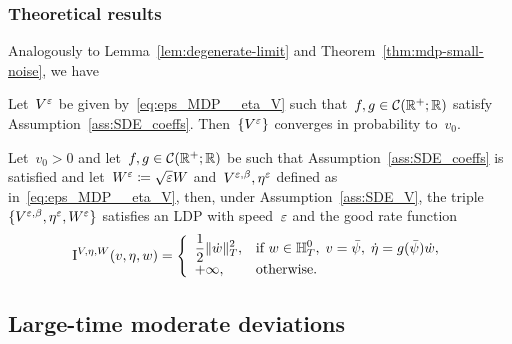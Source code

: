 \subsubsection{Theoretical results}

Analogously to Lemma~\ref{lem:degenerate-limit} and Theorem~\ref{thm:mdp-small-noise}, we have 
\begin{lemma} \label{lem:degenerate-limit-small}
Let~$V^{\varepsilon}$ be given by~\eqref{eq:eps_MDP__eta_V}
such that~$f,g\in\mathcal{C}(\mathbb{R}^+;  \mathbb{R})$ satisfy Assumption~\ref{ass:SDE_coeffs}. 
Then~$\{V^{\varepsilon}\}$ converges in probability to~$v_0$.
\end{lemma}



\begin{theorem}\label{mdp-small-time}
Let~$v_0>0$ and let~$f, g \in \mathcal{C}(\mathbb{R}^+;  \mathbb{R})$ be such that Assumption~\ref{ass:SDE_coeffs} is satisfied and let~$W^{\varepsilon} \coloneqq \sqrt{\varepsilon}W$ and~$V^{\varepsilon,\beta}, \eta^{\varepsilon}$ defined as in~\eqref{eq:eps_MDP__eta_V}, then, under Assumption~\ref{ass:SDE_V}, the triple
$\{V^{\varepsilon,\beta}, \eta^\varepsilon,W^\varepsilon\}$ satisfies an LDP with speed~$\varepsilon$ and the good rate function
\begin{equation*}
\mathrm{I}^{V,\eta,W}(v,\eta,w) = 
\left\{
\begin{array}{ll}
\displaystyle \frac{1}{2}\|\dot{w}\|_{T}^2, & \text{if }
\displaystyle 
w \in \mathbb{H}_T^0,\;
v = \bar\psi,\;
\dot{\eta} =  g(\bar\psi)\dot{w},\\
+\infty, & \text{otherwise}.
\end{array}
\right.
\end{equation*}
\end{theorem}


\subsection{Large-time moderate deviations} \label{sec:largetimeMDP}

